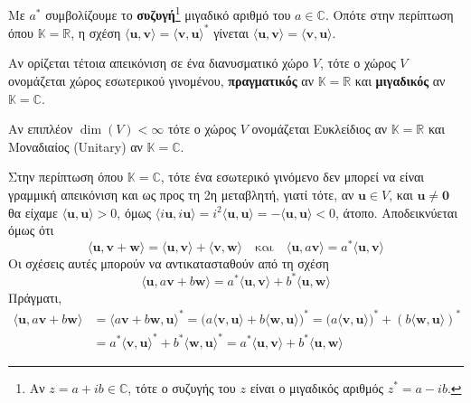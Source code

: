 \documentclass[a4paper,table]{report}
\begin{document}
\begin{rem}
\item {}
  \begin{myitemize}
    \item Με $ a^{*} $ συμβολίζουμε το \textbf{συζυγή}\footnote{Αν $ z=a+ib 
        \in \mathbb{C} $, τότε ο \textcolor{Col1}{συζυγής} του $ z $ είναι ο μιγαδικός 
      αριθμός $ z^{*} = a- ib $.} μιγαδικό αριθμό του $ a \in \mathbb{C} $. 
      Οπότε στην περίπτωση όπου $ \mathbb{K}= \mathbb{R} $, η σχέση $ \langle
      \mathbf{u}, \mathbf{v}\rangle = \langle \mathbf{v}, \mathbf{u}\rangle ^{*} $ 
      γίνεται $ \langle \mathbf{u}, \mathbf{v}\rangle = \langle \mathbf{v}, 
      \mathbf{u}\rangle $.
    \item Αν ορίζεται τέτοια απεικόνιση σε ένα διανυσματικό χώρο $V$, τότε ο χώρος 
      $V$ ονομάζεται \textcolor{Col1}{χώρος εσωτερικού γινομένου}, 
      \textbf{πραγματικός} αν $ \mathbb{K}= \mathbb{R} $ και \textbf{μιγαδικός} αν 
      $ \mathbb{K}= \mathbb{C} $.
    \item Αν επιπλέον $ \dim(V) < \infty $ τότε ο χώρος $ V $ ονομάζεται
      \textcolor{Col1}{Ευκλείδιος} αν $ \mathbb{K} = \mathbb{R} $ και
      \textcolor{Col1}{Μοναδιαίος} (Unitary) αν $ \mathbb{K}= \mathbb{C} $.
  \end{myitemize}
\end{rem}

\begin{rem}
  Στην περίπτωση όπου $ \mathbb{K}= \mathbb{C} $, τότε ένα εσωτερικό γινόμενο δεν μπορεί
  να είναι γραμμική απεικόνιση και ως προς τη 2η μεταβλητή, γιατί τότε, αν 
  $ \mathbf{u} \in V $, και $ \mathbf{u} \neq \mathbf{0} $ θα είχαμε 
  $ \langle \mathbf{u}, \mathbf{u}\rangle > 0 $, όμως $ \langle i \mathbf{u}, i 
  \mathbf{u}\rangle = i^{2} \langle \mathbf{u}, \mathbf{u}\rangle = - \langle 
  \mathbf{u}, \mathbf{u}\rangle < 0 $, άτοπο. Αποδεικνύεται όμως ότι 
  \[
    \langle \mathbf{u}, \mathbf{v}+ \mathbf{w}\rangle = \langle \mathbf{u},
    \mathbf{v}\rangle + \langle \mathbf{v}, \mathbf{w}\rangle \quad \text{και} \quad
    \langle \mathbf{u}, a \mathbf{v}\rangle = a^{*} \langle \mathbf{u}, 
    \mathbf{v}\rangle 
  \] 
  Οι σχέσεις αυτές μπορούν να αντικατασταθούν από τη σχέση 
  \[
    \langle \mathbf{u}, a \mathbf{v}+ b \mathbf{w}\rangle = a^{*} \langle \mathbf{u},
    \mathbf{v}\rangle + b^{*} \langle \mathbf{u}, \mathbf{w}\rangle 
  \] 
  Πράγματι, 
  \begin{align*}
    \langle \mathbf{u}, a \mathbf{v}+ b \mathbf{w}\rangle 
    &= \langle a \mathbf{v}+ b
    \mathbf{w}, \mathbf{u}\rangle ^{*} = \bigl(a \langle \mathbf{v}, \mathbf{u}\rangle + 
      b \langle \mathbf{w}, \mathbf{u}\rangle\bigr)^{*} = \bigl(a \langle \mathbf{v},
    \mathbf{u}\rangle\bigr)^{*} + (b \langle \mathbf{w}, \mathbf{u}\rangle)^{*} \\ 
    &= a^{*} \langle \mathbf{v}, \mathbf{u}\rangle^{*} + b^{*} \langle \mathbf{w},
    \mathbf{u}\rangle^{*} 
    = a^{*} \langle \mathbf{u}, \mathbf{v}\rangle + b^{*} \langle \mathbf{u}, 
    \mathbf{w}\rangle
  \end{align*} 
\end{rem}
\end{document}
